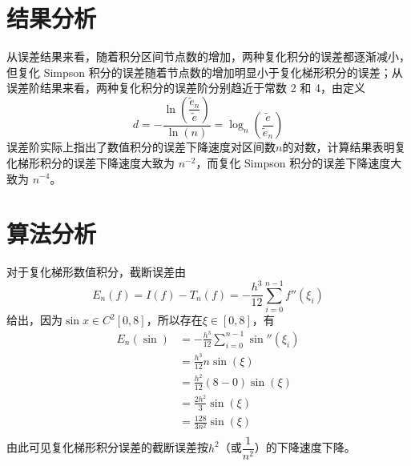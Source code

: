 \documentclass[11pt]{article}
\begin{document}
\section{结果分析}
从误差结果来看，随着积分区间节点数的增加，两种复化积分的误差都逐渐减小，但复化 Simpson 积分的误差随着节点数的增加明显小于复化梯形积分的误差；从误差阶结果来看，两种复化积分的误差阶分别趋近于常数 2 和 4，由定义
\begin{equation*}
    d = - \frac{\ln{\left(\dfrac{\widetilde{e}_n}{\widetilde{e}}\right)}}{\ln{(n)}} = \log_n{\left(\dfrac{\widetilde{e}}{\widetilde{e}_n}\right)}
\end{equation*}
误差阶实际上指出了数值积分的误差下降速度对区间数$n$的对数，计算结果表明复化梯形积分的误差下降速度大致为 $n^{-2}$，而复化 Simpson 积分的误差下降速度大致为 $n^{-4}$。

\section{算法分析}
对于复化梯形数值积分，截断误差由
$$
    E_n(f) = I(f) - T_n(f) = -\frac{h^3}{12}\sum_{i = 0}^{n - 1}{f''(\xi_i)}
$$
给出，因为$\sin{x} \in C^2[0, 8]$，所以存在$\xi \in [0, 8]$，有
\begin{align*}
    E_n(\sin) & = -\frac{h^3}{12}\sum_{i = 0}^{n - 1}{\sin''(\xi_i)} \\
              & = \frac{h^3}{12} n \sin(\xi)                         \\
              & = \frac{h^2}{12} (8 - 0) \sin(\xi)                   \\
              & = \frac{2h^2}{3}\sin(\xi)                            \\
              & = \frac{128}{3n^2}\sin(\xi)                          \\
\end{align*}
由此可见复化梯形积分误差的截断误差按$h^2$（或$\dfrac{1}{n^2}$）的下降速度下降。
\end{document}
